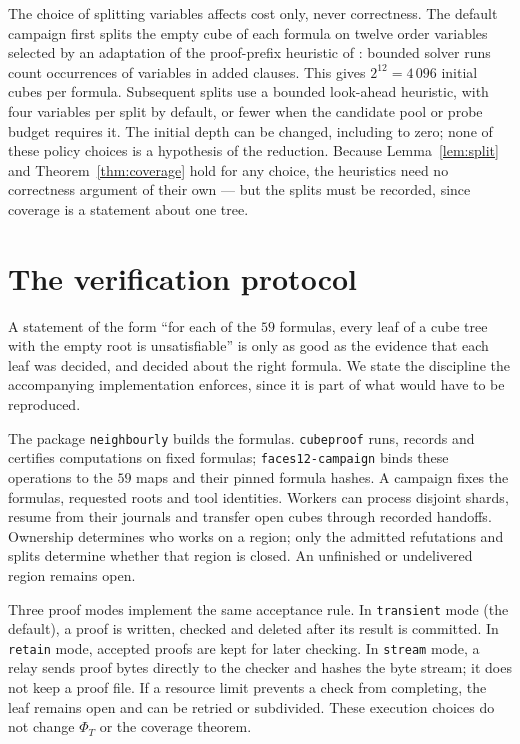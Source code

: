 \documentclass[11pt,reqno]{amsart}
\theoremstyle{plain}
\theoremstyle{definition}
\begin{document}
The choice of splitting variables affects cost only, never correctness. The default
campaign first splits the empty cube of each formula on twelve order variables selected
by an adaptation of the proof-prefix heuristic of \cite{BattlemanReevesHeule2025}: bounded
solver runs count occurrences of variables in added clauses. This gives $2^{12}=4\,096$
initial cubes per formula. Subsequent splits use a bounded look-ahead heuristic, with four
variables per split by default, or fewer when the candidate pool or probe budget requires it. The initial depth
can be changed, including to zero; none of these policy choices is a hypothesis of the
reduction. Because Lemma~\ref{lem:split} and
Theorem~\ref{thm:coverage} hold for any choice, the heuristics need no correctness argument of
their own --- but the splits must be recorded, since coverage is a statement about one tree.

\section{The verification protocol}\label{sec:protocol}

A statement of the form ``for each of the $59$ formulas, every leaf of a cube tree with the empty
root is unsatisfiable'' is only as good as the evidence that each leaf was decided, and decided
about the right formula. We state the discipline the accompanying implementation enforces, since
it is part of what would have to be reproduced.

The package \texttt{neighbourly} builds the formulas.
\texttt{cubeproof} runs, records and certifies computations on fixed formulas;
\texttt{faces12-campaign} binds these operations to the $59$ maps and their pinned
formula hashes. A campaign fixes the formulas, requested roots and tool identities.
Workers can process disjoint shards, resume from their journals and transfer open
cubes through recorded handoffs. Ownership determines who works on a region;
only the admitted refutations and splits determine whether that region is closed.
An unfinished or undelivered region remains open.

Three proof modes implement the same acceptance rule. In \texttt{transient} mode
(the default), a proof is written, checked and deleted after its result is committed.
In \texttt{retain} mode, accepted proofs are kept for later checking.
In \texttt{stream} mode, a relay sends proof bytes directly to the checker and hashes
the byte stream; it does not keep a proof file. If a resource limit prevents a check
from completing, the leaf remains open and can be retried or subdivided. These
execution choices do not change $\Phi_T$ or the coverage theorem.
\end{document}
